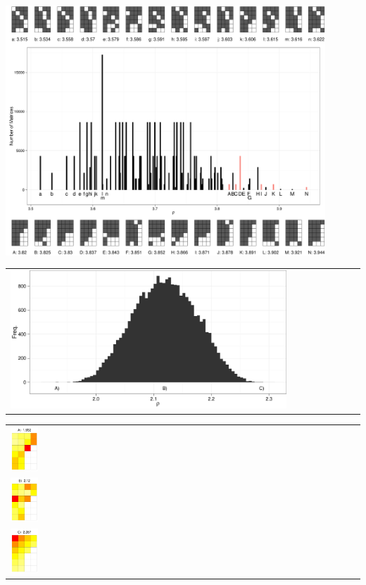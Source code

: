 \documentclass[pdftex]{nature}
\begin{document}
 \includegraphics[width=0.9\textwidth]{Figures/Rho-17.pdf}

\newpage
{} 

\begin{tabular}{l}
    \includegraphics[width=0.8\textwidth]{Figures/FigQuant6-4-17-a.pdf}
  \end{tabular}
  \begin{tabular}{p{} }
    \includegraphics[width=0.08\textwidth]{Figures/Min-6-4-17.pdf}\\
    \includegraphics[width=0.08\textwidth]{Figures/Mean-6-4-17.pdf}\\
    \includegraphics[width=0.08\textwidth]{Figures/Max-6-4-17.pdf}\\
  \end{tabular}
\end{document}
